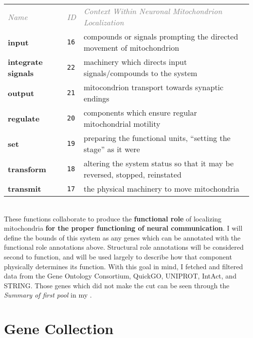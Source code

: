 \begin{tabularx}{\linewidth}{l l X}
  \textit{\textcolor{grey}{Name}} & \textit{\textcolor{grey}{ID}} & \textit{\textcolor{grey}{Context Within Neuronal Mitochondrion Localization}} \\
  \textbf{input} & \texttt{16} & compounds or signals prompting the directed movement of mitochondrion \\
  \textbf{integrate signals} & \texttt{22} & machinery which directs input signals/compounds to the system \\
  \textbf{output} & \texttt{21} & mitocondrion transport towards synaptic endings \\
  \textbf{regulate} & \texttt{20} & components which ensure regular mitochondrial motility \\
  \textbf{set} & \texttt{19} & preparing the functional units, ``setting the stage'' as it were  \\
  \textbf{transform} & \texttt{18} & altering the system status so that it may be reversed, stopped, reinstated \\
  \textbf{transmit} & \texttt{17} & the physical machinery to move mitochondria \\
\end{tabularx} \\

These functions collaborate to produce the \textbf{functional role} of
localizing mitochondria \textbf{for the proper functioning of neural
communication}. I will define the bounds of this system as any genes which can
be annotated with the functional role annotations above. Structural role
annotations will be considered second to function, and will be used largely to
describe how that component physically determines its function. With this goal
in mind, I fetched and filtered data from the Gene Ontology Consortium, QuickGO,
UNIPROT, IntAct, and STRING. Those genes which did not make the cut can be seen
through the \textit{Summary of first pool} in my \firstpool.

\section{Gene Collection}





